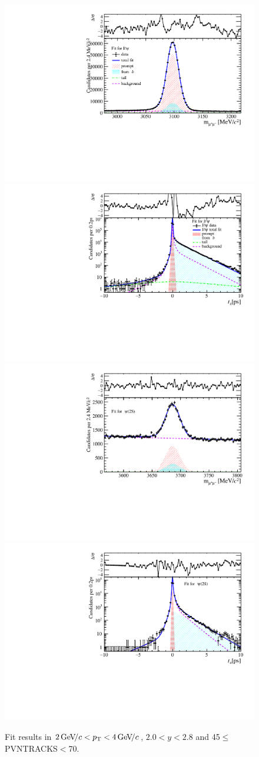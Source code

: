 \begin{figure}[H]
\begin{center}
\includegraphics[width=0.47\linewidth]{pdf/Jpsi/drawmass/n3y1pt2.pdf}
\includegraphics[width=0.47\linewidth]{pdf/Jpsi/2DFit/n3y1pt2.pdf}
\vspace*{-0.5cm}
\includegraphics[width=0.47\linewidth]{pdf/Psi2S/drawmass/n3y1pt2.pdf}
\includegraphics[width=0.47\linewidth]{pdf/Psi2S/2DFit/n3y1pt2.pdf}
\vspace*{-0.5cm}
\end{center}
\caption{Fit results in $2\text{\,Ge\kern -0.1em V\!/}c<p_{\mathrm{T}}<4\text{\,Ge\kern -0.1em V\!/}c$, $2.0<y<2.8$ and 45$\leq$PVNTRACKS$<$70.}
\label{Fitn3y1pt2}
\end{figure}
